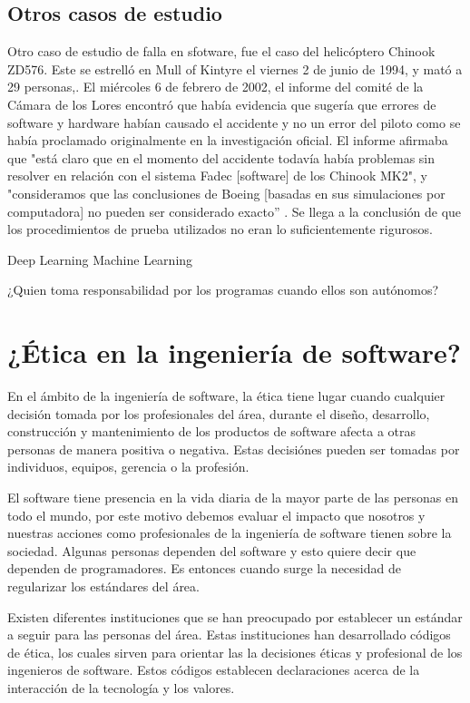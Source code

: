 \documentclass[twoside]{article}
\begin{document}
\begin{multicols}{2}
\subsection{Otros casos de estudio}

Otro caso de estudio de falla en sfotware, fue el caso del helicóptero Chinook
ZD576. Este se estrelló en Mull of Kintyre el viernes 2 de junio de 1994,  y
mató a 29 personas,. El miércoles 6 de febrero de 2002, el informe del comité de
la Cámara de los Lores encontró que había evidencia que sugería que errores de
software y hardware habían causado el accidente y no un error del piloto como se
había proclamado originalmente en la investigación oficial. El informe afirmaba
que "está claro que en el momento del accidente todavía había problemas sin
resolver en relación con el sistema Fadec [software] de los Chinook MK2", y
"consideramos que las conclusiones de Boeing [basadas en sus simulaciones por
computadora] no pueden ser considerado exacto” \cite{collins2002software}. Se
llega a la conclusión de que los procedimientos de prueba utilizados no eran lo
suficientemente rigurosos.




Deep Learning
Machine Learning

¿Quien toma responsabilidad por los programas cuando ellos son autónomos?


\section{¿Ética en la ingeniería de software?}

En el ámbito de la ingeniería de software, la ética tiene lugar cuando cualquier
decisión tomada por los profesionales del área, durante el diseño, desarrollo,
construcción y mantenimiento de los productos de software afecta a otras
personas de manera positiva o negativa. Estas decisiónes pueden ser tomadas por
individuos, equipos, gerencia o la profesión.

El software tiene presencia en la vida diaria de la mayor parte de las personas
en todo el mundo, por este motivo debemos evaluar el impacto que nosotros y
nuestras acciones como profesionales de la ingeniería de software tienen sobre
la sociedad. Algunas personas dependen del software y esto quiere decir que
dependen de programadores. Es entonces cuando surge la necesidad de regularizar
los estándares del área.

Existen diferentes instituciones que se han preocupado por establecer un
estándar a seguir para las personas del área. Estas instituciones han
desarrollado códigos de ética, los cuales sirven para orientar las la decisiones
éticas y profesional de los ingenieros de software. Estos códigos establecen
declaraciones acerca de la interacción de la tecnología y los valores.


\end{multicols}
\end{document}

